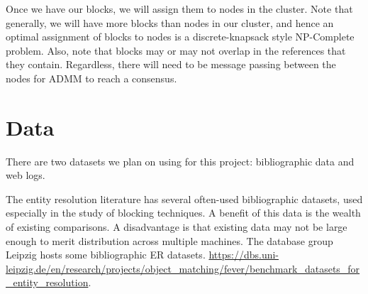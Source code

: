 \documentclass{article}
\begin{document}
Once we have our blocks, we will assign them to nodes in the cluster. Note that generally, we will have more blocks than nodes in our cluster, and hence an optimal assignment of blocks to nodes is a discrete-knapsack style NP-Complete problem. Also, note that blocks may or may not overlap in the references that they contain. Regardless, there will need to be message passing between the nodes for ADMM to reach a consensus. 

\section{Data}

There are two datasets we plan on using for this project: bibliographic data and web logs.

The entity resolution literature has several often-used bibliographic datasets, used especially in the study of blocking techniques. A benefit of this data is the wealth of existing comparisons. A disadvantage is that existing data may not be large enough to merit distribution across multiple machines. The database group Leipzig hosts some bibliographic ER datasets\cite{kopcke2010evaluation}. \url{https://dbs.uni-leipzig.de/en/research/projects/object_matching/fever/benchmark_datasets_for_entity_resolution}. 
\end{document}
